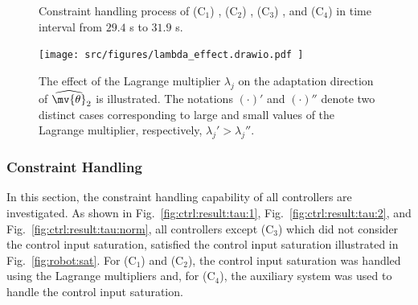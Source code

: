 \documentclass[journal]{IEEEtran}
\begin{document}
\begin{figure}[t]
    \centering
    \subfloat[Control input $\tau$ locus in time interval from $29.4$ s to $31.9$ s.]{
        \texttt{[image: 
            src/measurement/figures/compare/Fig6.eps
        ]}%
        \label{fig:ctrl:result:scope:control}}
        \vfill
        \vfill
  \caption{
    Constraint handling process of (C$_1$) \protect{}, (C$_2$) \protect{}, (C$_3$) \protect{}, and (C$_4$) \protect{} in time interval from $29.4$ s to $31.9$ s.
  }
\label{fig:ctrl:result:scope}
\end{figure}

\begin{figure}[!t]
	\centering
	\texttt{[image: 
		src/figures/lambda\_effect.drawio.pdf
		]}
	\caption{
        The effect of the Lagrange multiplier $\lambda_{j}$ on the adaptation direction of $\widehat{\mv{\theta}}_2$ is illustrated. 
        The notations $(\cdot)'$ and $(\cdot)''$ denote two distinct cases corresponding to large and small values of the Lagrange multiplier, respectively, \ie $\lambda_{j}' > \lambda_{j}''$.
	}
	\label{fig:lambda_effect}
\end{figure}

\hfill

\subsubsection{Constraint Handling} \label{sec:sim:constraint}

In this section, the constraint handling capability of all controllers are investigated.
As shown in Fig.~\ref{fig:ctrl:result:tau:1}, Fig.~\ref{fig:ctrl:result:tau:2}, and Fig.~\ref{fig:ctrl:result:tau:norm}, all controllers except (C$_3$) which did not consider the control input saturation, satisfied the control input saturation illustrated in Fig.~\ref{fig:robot:sat}.
For (C$_1$) and (C$_2$), the control input saturation was handled using the Lagrange multipliers and, for (C$_4$), the auxiliary system was used to handle the control input saturation.
\end{document}
